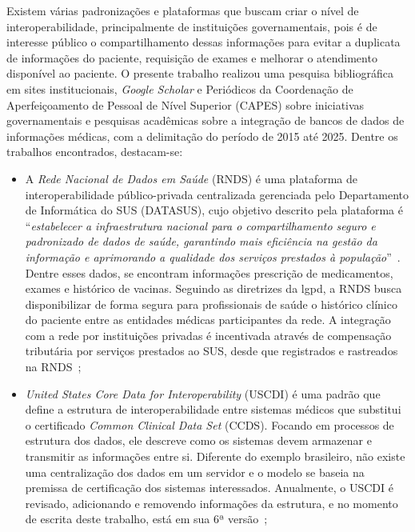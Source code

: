 Existem várias padronizações e plataformas que buscam criar o nível de interoperabilidade, principalmente de instituições governamentais, pois é de interesse público o compartilhamento dessas informações para evitar a duplicata de informações do paciente, requisição de exames e melhorar o atendimento disponível ao paciente. O presente trabalho realizou uma pesquisa bibliográfica em sites institucionais, \textit{Google Scholar} e  Periódicos da Coordenação de Aperfeiçoamento de Pessoal de Nível Superior (CAPES) sobre iniciativas governamentais e pesquisas acadêmicas sobre a integração de bancos de dados de informações médicas, com a delimitação do período de 2015 até 2025. Dentre os trabalhos encontrados, destacam-se:
\begin{itemize}
  \item A \textit{Rede Nacional de Dados em Saúde} (RNDS) é uma plataforma de interoperabilidade público-privada centralizada gerenciada pelo Departamento de Informática do SUS (DATASUS), cujo objetivo descrito pela plataforma é ``\textit{estabelecer a infraestrutura nacional para o compartilhamento seguro e padronizado de dados de saúde, garantindo mais eficiência na gestão da informação e aprimorando a qualidade dos serviços prestados à população}''~\cite{RNDS}. Dentre esses dados, se encontram informações prescrição de medicamentos, exames e histórico de vacinas. Seguindo as diretrizes da \gls{lgpd}, a RNDS busca disponibilizar de forma segura para profissionais de saúde o histórico clínico do paciente entre as entidades médicas participantes da rede. A integração com a rede por instituições privadas é incentivada através de compensação tributária por serviços prestados ao SUS, desde que registrados e rastreados na RNDS~\cite{RNDS, RNDS-Guia, DATASUS, Falcao_Rachid_Fornazin_2024};
  \item \textit{United States Core Data for Interoperability} (USCDI) é uma padrão que define a estrutura de interoperabilidade entre sistemas médicos que substitui o certificado  \textit{Common Clinical Data Set} (CCDS). Focando em processos de estrutura dos dados, ele descreve como os sistemas devem armazenar e transmitir as informações entre si. Diferente do exemplo brasileiro, não existe uma centralização dos dados em um servidor e o modelo se baseia na premissa de certificação dos sistemas interessados. Anualmente, o USCDI é revisado, adicionando e removendo informações da estrutura, e no momento de escrita deste trabalho, está em sua 6ª versão~\cite{USCDI,USCDI-FHIR, USCDI-CERT, CuresActFinalRule, HIMSS-ONC-Interoperability};

\end{itemize}

